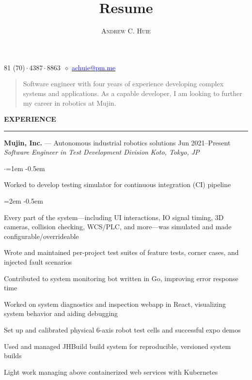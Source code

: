 \documentclass[10pt, a4paper]{article}
\makeatletter
\newenvironment{aSection}[1]{
    \medskip \textbf{\uppercase{#1}}
    \smallskip
    \hrule
    \begin{list}{}{
            \setlength{\leftmargin}{1.5em}
        }
    \item[]
    }{
    \end{list}
}
\newenvironment{expSubsection}[4]{
    {#1} \hfill {#2} \\
    \textit{#3} \hfill \textit{#4}
    \smallskip
    \begin{list}{$\cdot$}{\leftmargin=1em}
    \itemsep -0.5em \vspace{-0.5em}
    }{
    \end{list}
    \vspace{0.5em}
}
\newenvironment{subList}{
    \begin{list}{\raisebox{.4ex}{\tiny$\succ$}}{\leftmargin=2em}
    \itemsep -0.5em \vspace{-0.5em}
    }{
    \end{list}
}
\renewcommand{\maketitle}{
    \begin{center}
        {\Huge\theauthor}

        \vspace{0.25em}

        \raisebox{.3ex}{\footnotesize+}81 (70)\,$\cdot$\,4387\,$\cdot$\,8863~$\diamond$
        \href{mailto:achuie@pm.me}{\textcolor{blue}{
            achuie@pm.me
        }}
    \end{center}

    \vspace{1em}

    \begingroup
    \addtolength\leftmargini{5em}
    \begin{quote}
        Software engineer with four years of experience developing complex systems and applications. As a
        capable developer, I am looking to further my career in robotics at Mujin.
    \end{quote}
    \endgroup

}
\makeatother
\begin{document}
\title{Resume}
\author{\textsc{Andrew C. Huie}}

\maketitle

\begin{aSection}{Experience}
    \begin{expSubsection}
        {\textbf{Mujin, Inc.} --- Autonomous industrial robotics solutions}
        {Jun 2021--Present}
        {Software Engineer in Test Development Division}
        {Koto, Tokyo, JP}
    \item Worked to develop testing simulator for continuous integration (CI) pipeline
        \begin{subList}
            \item Every part of the system---including UI interactions, IO signal timing, 3D
                cameras, collision checking, WCS/PLC, and more---was simulated and made
                configurable/overrideable
            \item Wrote and maintained per-project test suites of feature tests, corner cases, and injected fault scenarios
        \end{subList}
    \item Contributed to system monitoring bot written in Go, improving error response time
    \item Worked on system diagnostics and inspection webapp in React, visualizing system behavior
        and aiding debugging
    \item Set up and calibrated physical 6-axis robot test cells and successful expo demos
    \item Used and managed JHBuild build system for reproducible, versioned system builds
    \item Light work managing above containerized web services with Kubernetes
    \end{expSubsection}


\end{aSection}
\end{document}
